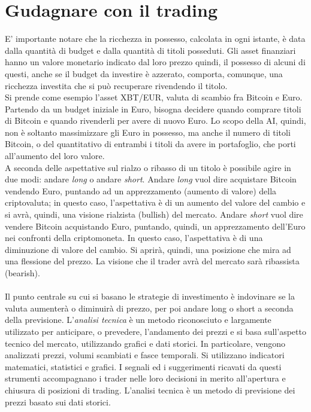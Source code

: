 \documentclass[a4paper,12pt]{report}
\begin{document}
\section{Gudagnare con il trading}
E' importante notare che la ricchezza in possesso, calcolata in ogni istante, è data dalla quantità di budget e dalla quantità di titoli posseduti. Gli asset finanziari hanno un valore monetario indicato dal loro prezzo quindi, il possesso di alcuni di questi, anche se il budget da investire è azzerato, comporta, comunque, una ricchezza investita che si può recuperare rivendendo il titolo.\\
Si prende come esempio l'asset XBT/EUR, valuta di scambio fra Bitcoin e Euro. Partendo da un budget iniziale in Euro, bisogna decidere quando comprare titoli di Bitcoin e quando rivenderli per avere di nuovo Euro. Lo scopo della AI, quindi, non è soltanto massimizzare gli Euro in possesso, ma anche il numero di titoli Bitcoin, o del quantitativo di entrambi i titoli da avere in portafoglio, che porti all'aumento del loro valore.\\
A seconda delle aspettative sul rialzo o ribasso di un titolo è possibile agire in due modi: andare \textit{long} o andare \textit{short}. Andare \textit{long} vuol dire acquistare Bitcoin vendendo Euro, puntando ad un apprezzamento (aumento di valore) della criptovaluta; in questo caso, l’aspettativa è di un aumento del valore del cambio e si avrà, quindi, una visione rialzista (bullish) del mercato. Andare \textit{short} vuol dire vendere Bitcoin acquistando Euro, puntando, quindi, un apprezzamento dell'Euro nei confronti della criptomoneta. In questo caso, l’aspettativa è di una diminuzione di valore del cambio. Si aprirà, quindi, una posizione che mira ad una flessione del prezzo. La visione che il trader avrà del mercato sarà ribassista (bearish).\\~\\
Il punto centrale su cui si basano le strategie di investimento è indovinare se la valuta aumenterà o diminuirà di prezzo, per poi andare long o short a seconda della previsione. L'\textit{analisi tecnica} è un metodo riconosciuto e largamente utilizzato per anticipare, o prevedere, l'andamento dei prezzi e si basa sull'aspetto tecnico del mercato, utilizzando grafici e dati storici. In particolare, vengono analizzati prezzi, volumi scambiati e fasce temporali. Si utilizzano indicatori matematici, statistici e grafici. I segnali ed i suggerimenti ricavati da questi strumenti accompagnano i trader nelle loro decisioni in merito all'apertura e chiusura di posizioni di trading. L'analisi tecnica è un metodo di previsione dei prezzi basato sui dati storici.
\end{document}
